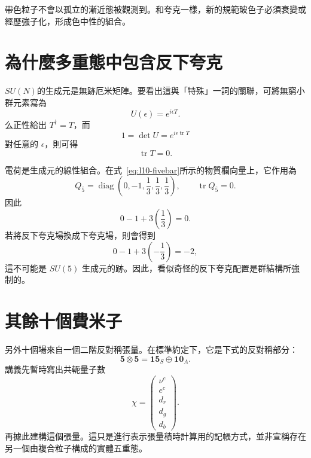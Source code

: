 帶色粒子不會以孤立的漸近態被觀測到。和夸克一樣，新的規範玻色子必須衰變或經歷強子化，形成色中性的組合。

\section{為什麼多重態中包含反下夸克}

\(SU(N)\)的生成元是無跡厄米矩陣。要看出這與「特殊」一詞的關聯，可將無窮小群元素寫為
\begin{equation}
U(\epsilon)=e^{i\epsilon T}.
\end{equation}
么正性給出 \(T^\dagger=T\)，而
\begin{equation}
1=\det U=e^{i\epsilon\operatorname{tr}T}
\end{equation}
對任意的 \(\epsilon\)，則可得
\begin{equation}
\operatorname{tr}T=0.
\label{eq:l10-traceless-generator}
\end{equation}

電荷是生成元的線性組合。在式~\eqref{eq:l10-fivebar}所示的物質欄向量上，它作用為
\begin{equation}
Q_{\overline5}
=
\operatorname{diag}
\left(0,-1,\frac13,\frac13,\frac13\right),
\qquad
\operatorname{tr}Q_{\overline5}=0.
\label{eq:l10-charge-fivebar}
\end{equation}
因此
\begin{equation}
0-1+3\left(\frac13\right)=0.
\end{equation}
若將反下夸克場換成下夸克場，則會得到
\begin{equation}
0-1+3\left(-\frac13\right)=-2,
\end{equation}
這不可能是 \(SU(5)\) 生成元的跡。因此，看似奇怪的反下夸克配置是群結構所強制的。

\section{其餘十個費米子}

另外十個場來自一個二階反對稱張量。在標準約定下，它是下式的反對稱部分：
\begin{equation}
\mathbf5\otimes\mathbf5
=\mathbf{15}_S\oplus\mathbf{10}_A.
\label{eq:l10-five-five}
\end{equation}
講義先暫時寫出共軛量子數
\begin{equation}
\chi=
\begin{pmatrix}
\nu^c\\
e^c\\
d_r\\
d_g\\
d_b
\end{pmatrix}.
\label{eq:l10-aux-five}
\end{equation}
再據此建構這個張量。這只是進行表示張量積時計算用的記帳方式，並非宣稱存在另一個由複合粒子構成的實體五重態。

